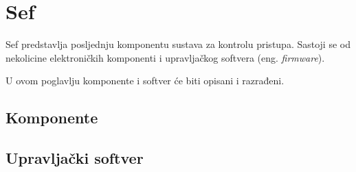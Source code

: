 \chapter{Sef}

Sef predstavlja posljednju komponentu sustava za kontrolu pristupa.
Sastoji se od nekolicine elektroničkih komponenti i upravljačkog softvera (eng. \textit{firmware}).

U ovom poglavlju komponente i softver će biti opisani i razrađeni.

\section{Komponente}


\section{Upravljački softver}

